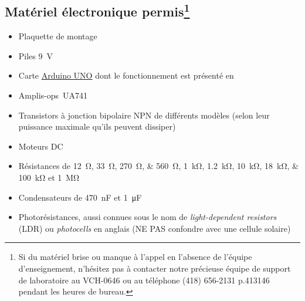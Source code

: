 \documentclass[english,french,12pt]{article}
\begin{document}
\subsection*{Matériel électronique permis\footnote{Si du matériel brise ou manque à l'appel en l'absence de l'équipe d'enseignement, n'hésitez pas à contacter notre précieuse équipe de support de laboratoire au VCH-0646 ou au téléphone (418) 656-2131 p.413146 pendant les heures de bureau.}} 
\begin{itemize}
    \item Plaquette de montage
    \item Piles \SI{9}{\volt}
    \item Carte \href{https://www.arduino.cc/en/Guide/ArduinoUno}{Arduino UNO} dont le fonctionnement est présenté en 
    \item Amplis-ops~UA741
    \item Transistors à jonction bipolaire NPN de différents modèles (selon leur puissance maximale qu'ils peuvent dissiper)
    \item Moteurs DC
    \item Résistances de \SIlist[list-final-separator = {, }]{12;33;270;560}{\ohm}, \SIlist[list-final-separator = {, }]{1;1.2;10; 18;100}{\kilo\ohm} et \SI{1}{\mega\ohm}
    \item Condensateurs de \SI{470}{\nano\farad} et \SI{1}{\micro\farad}
    \item Photorésistances, aussi connues sous le nom de \textit{light-dependent resistors} (LDR) ou \textit{photocells} en anglais (NE PAS confondre avec une cellule solaire)
\end{itemize}
\end{document}

